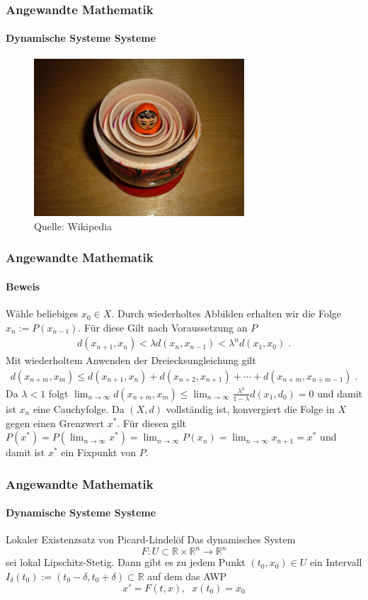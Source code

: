 \documentclass{beamer}
\begin{document}
\begin{frame}
    \frametitle{Angewandte Mathematik}
\framesubtitle{Dynamische Systeme Systeme}
\begin{figure}[H]
      \centering
    \includegraphics[width=0.7\textwidth]{images/640px-Floral_matryoshka_set_2_smallest_doll_nested.JPG}
\caption{Quelle: Wikipedia}
\end{figure}

 \end{frame}


\begin{frame}
    \frametitle{Angewandte Mathematik}
\framesubtitle{Beweis}
Wähle beliebiges $x_0 \in X$. Durch wiederholtes Abbilden erhalten wir die Folge  $x_n:= P(x_{n-1})$. Für diese Gilt nach Voraussetzung an $P$
\begin{align*}
d(x_{n+1} , x_{n}) < \lambda d(x_{n} , x_{n-1})   < \lambda^n d(x_{1} , x_{0})  \; .
\end{align*}
Mit wiederholtem Anwenden der Dreiecksungleichung gilt 
\begin{align*}
d(x_{n + m} , x_{ m}) \leq d(x_{n+1} , x_{n})  +  d(x_{n +2} , x_{n +1}) +   \cdots   +  d(x_{n + m } , x_{n +m -1}) \; .
\end{align*}
Da $\lambda < 1$ folgt $  \lim_{n \to \infty} d(x_{n + m} , x_{ m})   \leq  \lim_{n \to \infty} \frac{\lambda^n}{1 - \lambda} d(x_{1} , d_{0}) = 0$ und damit ist $x_n$ eine Cauchyfolge.  Da $(X,d)$ vollständig ist, konvergiert die Folge in $X$ gegen einen Grenzwert $x^*$. Für diesen gilt $P(x^*) =  P (  \lim_{n \to \infty}  x^*) =  \lim_{n \to \infty} P(x_n)  =  \lim_{n \to \infty} x_{n+1} = x^*$ und damit ist $x^*$ ein Fixpunkt von $P$.

 \end{frame}

\begin{frame}
    \frametitle{Angewandte Mathematik}
\framesubtitle{Dynamische Systeme Systeme}
\begin{block}{Lokaler Existenzsatz von Picard-Lindelöf}
Das dynamisches System  $$F : U \subset \mathbb{R} \times \mathbb{R}^n \to \mathbb{R}^n$$ sei lokal Lipschitz-Stetig. 
Dann gibt es zu jedem Punkt $(t_0, x_0) \in U$ ein Intervall $I_\delta (t_0) := (t_0 - \delta, t_0 + \delta) \subset \mathbb{R}$ auf dem das AWP 
$$ x' = F(t,x), \; \; x(t_0) = x_0$$
\end{block}

 \end{frame}
\end{document}
